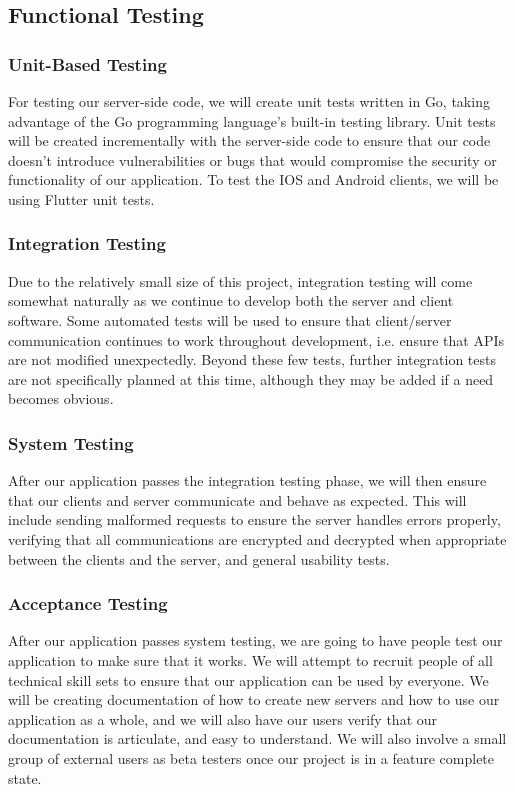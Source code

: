 \documentclass[11pt]{article}
\begin{document}
\subsection{Functional Testing}
\subsubsection*{Unit-Based Testing}
For testing our server-side code, we will create unit tests written in Go, taking advantage of the Go programming language’s built-in testing library. Unit tests will be created incrementally with the server-side code to ensure that our code doesn’t introduce vulnerabilities or bugs that would compromise the security or functionality of our application. To test the IOS and Android clients, we will be using Flutter unit tests.

\subsubsection*{Integration Testing}
Due to the relatively small size of this project, integration testing will come somewhat naturally as we continue to develop both the server and client software. Some automated tests will be used to ensure that client/server communication continues to work throughout development, i.e. ensure that APIs are not modified unexpectedly. Beyond these few tests, further integration tests are not specifically planned at this time, although they may be added if a need becomes obvious. 

\subsubsection*{System Testing}
After our application passes the integration testing phase, we will then ensure that our clients and server communicate and behave as expected. This will include sending malformed requests to ensure the server handles errors properly, verifying that all communications are encrypted and decrypted when appropriate between the clients and the server, and general usability tests.

\subsubsection*{Acceptance Testing}
After our application passes system testing, we are going to have people test our application to make sure that it works. We will attempt to recruit people of all technical skill sets to ensure that our application can be used by everyone. We will be creating documentation of how to create new servers and how to use our application as a whole, and we will also have our users verify that our documentation is articulate, and easy to understand. We will also involve a small group of external users as beta testers once our project is in a feature complete state.
\end{document}
